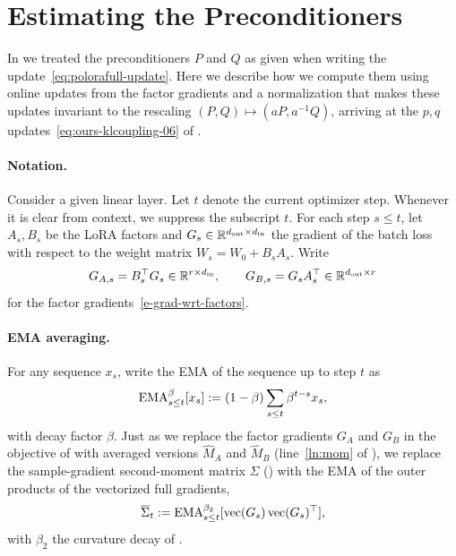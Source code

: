 
\section{Estimating the Preconditioners}
\label{app:matnormal-06}
In  we treated the preconditioners $P$ and $Q$ as given when writing the update~\eqref{eq:polorafull-update}. Here we describe how we compute them using online updates from the factor gradients and a normalization that makes these updates invariant to the rescaling $(P,Q)\mapsto(aP,a^{-1}Q)$, arriving at the $p,q$ updates~\eqref{eq:ours-klcoupling-06} of .

\paragraph{Notation.} Consider a given linear layer. Let $t$ denote the current optimizer step. Whenever it is clear from context, we suppress the subscript $t$. For each step $s\le t$,
let $A_s,B_s$ be the LoRA factors and
$G_s\in\mathbb{R}^{d_{\mathrm{out}}\times d_{\mathrm{in}}}$ the gradient of the batch loss with respect to the weight matrix $W_s=W_0+B_sA_s$. Write
\[
  G_{A,s}=B_s^\top G_s\in\mathbb{R}^{r\times d_{\mathrm{in}}},\qquad
  G_{B,s}=G_sA_s^\top\in\mathbb{R}^{d_{\mathrm{out}}\times r}
\]
for the factor
gradients~\eqref{e-grad-wrt-factors}. 

\paragraph{EMA averaging.} For any sequence $x_s$, write the EMA of the sequence up to step $t$ as
\[
  \operatorname{EMA}^{\beta}_{s\le t}[x_s]:=(1-\beta)\sum_{s\le t}\beta^{t-s} x_s,
\]
with decay factor $\beta$. Just as we replace the factor gradients $G_A$ and $G_B$ in the objective of  with averaged versions $\widehat M_A$ and $\widehat M_B$ (line~\ref{ln:mom} of ), we replace the sample-gradient second-moment matrix $\Sigma$ () with the EMA of the outer products of the vectorized full gradients,
\[
  \overline \Sigma_t:=\operatorname{EMA}^{\beta_2}_{s\le t}[\operatorname{vec}(G_s) \operatorname{vec}(G_s)^\top],
\]
with $\beta_2$ the curvature decay of .

